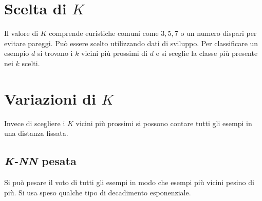 \section{Scelta di $K$}
Il valore di $K$ comprende euristiche comuni come $3, 5, 7$ o un numero dispari per evitare pareggi.
Pu\`o essere scelto utilizzando dati di sviluppo.
Per classificare un esempio $d$ si trovano i $k$ vicini pi\`u prossimi di $d$ e si sceglie la classe pi\`u presente nei $k$ scelti.

\section{Variazioni di $K$}
Invece di scegliere i $K$ vicini pi\`u prossimi si possono contare tutti gli esempi in una distanza fissata.

	\subsection{\emph{K-NN} pesata}
	Si pu\`o pesare il voto di tutti gli esempi in modo che esempi pi\`u vicini pesino di pi\`u.
	Si usa speso qualche tipo di decadimento esponenziale.
